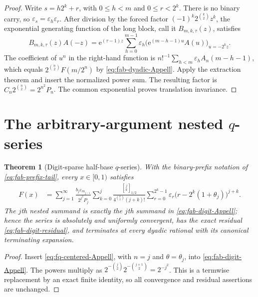 \documentclass[11pt,oneside,openany]{book}
\newtheorem{theorem}{Theorem}[chapter]
\theoremstyle{definition}
\theoremstyle{remark}
\newcommand{\Qbinom}[3]{\genfrac{[}{]}{0pt}{}{#1}{#2}_{#3}}
\newcommand{\e}{\mathrm e}
\begin{document}
\begin{proof}
Write $s=h2^k+r$, with $0\le h<m$ and $0\le r<2^k$.  There is no binary
carry, so $\varepsilon_s=\varepsilon_h\varepsilon_r$.  After division by the
forced factor $(-1)^k2^{\binom k2}z^k$, the exponential generating function of
the long block, call it $B_{m,k,\tau}(z)$, satisfies
\begin{equation}
 B_{m,k,\tau}(z)A(-z)
 =\e^{(\tau-1)z}
 \sum_{h=0}^{m-1}\varepsilon_h
 \bigl(\e^{(m-h-1)u}A(u)\bigr)_{u=-2^kz}.
 \label{eq:fq-long-block-bridge}
\end{equation}
The coefficient of $u^n$ in the right-hand function is
$n!^{-1}\sum_{h<m}\varepsilon_hA_n(m-h-1)$, which equals
$2^{\binom n2}F(m/2^n)$ by \eqref{eq:fab-dyadic-Appell}.  Apply the extraction
theorem and insert the normalized power sum.  The resulting factor is
$C_n2^{\binom n2}=2^{n^2}P_n$.  The common exponential proves translation
invariance.
\end{proof}

\section{The arbitrary-argument nested \texorpdfstring{$q$}{q}-series}

\begin{theorem}[Digit-sparse half-base $q$-series]
\label{thm:fq-digit-series}
With the binary-prefix notation of \eqref{eq:fab-prefix-tail}, every
$x\in[0,1)$ satisfies
\begin{align}
 F(x)
 &=\sum_{j=1}^{\infty}
 \frac{b_j\varepsilon_{m_{j-1}}}{2^{j^2}P_j}
 \sum_{k=0}^{j}\frac{\Qbinom jk{1/2}}
 {4^{\binom k2}(j+k)!}
 \sum_{r=0}^{2^k-1}\varepsilon_r
 \bigl(r-2^k(1+\theta_j)\bigr)^{j+k}.
 \label{eq:fq-digit-series}
\end{align}
The $j$th nested summand is exactly the $j$th summand in
\eqref{eq:fab-digit-Appell}; hence the series is absolutely and uniformly
convergent, has the exact residual \eqref{eq:fab-digit-residual}, and
terminates at every dyadic rational with its canonical terminating expansion.
\end{theorem}

\begin{proof}
Insert \eqref{eq:fq-centered-Appell}, with $n=j$ and
$\theta=\theta_j$, into \eqref{eq:fab-digit-Appell}.  The powers multiply as
$2^{-\binom j2}2^{-\binom{j+1}{2}}=2^{-j^2}$.  This is a termwise replacement
by an exact finite identity, so all convergence and residual assertions are
unchanged.
\end{proof}
\end{document}
